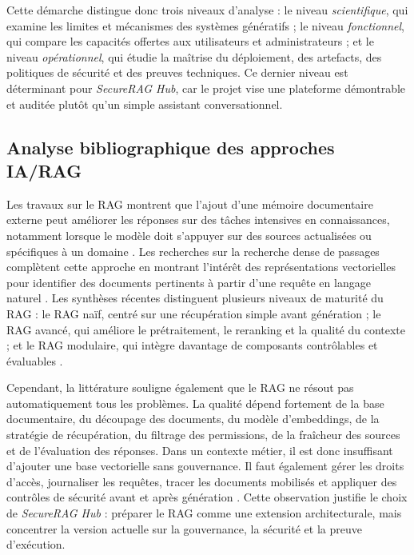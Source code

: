 Cette démarche distingue donc trois niveaux d’analyse : le niveau \textit{scientifique}, qui examine les limites et mécanismes des systèmes génératifs ; le niveau \textit{fonctionnel}, qui compare les capacités offertes aux utilisateurs et administrateurs ; et le niveau \textit{opérationnel}, qui étudie la maîtrise du déploiement, des artefacts, des politiques de sécurité et des preuves techniques. Ce dernier niveau est déterminant pour \textit{SecureRAG Hub}, car le projet vise une plateforme démontrable et auditée plutôt qu’un simple assistant conversationnel.

\subsection{Analyse bibliographique des approches IA/RAG}

Les travaux sur le RAG montrent que l’ajout d’une mémoire documentaire externe peut améliorer les réponses sur des tâches intensives en connaissances, notamment lorsque le modèle doit s’appuyer sur des sources actualisées ou spécifiques à un domaine \cite{lewis_rag_2020}. Les recherches sur la recherche dense de passages complètent cette approche en montrant l’intérêt des représentations vectorielles pour identifier des documents pertinents à partir d’une requête en langage naturel \cite{karpukhin_dpr_2020}. Les synthèses récentes distinguent plusieurs niveaux de maturité du RAG : le RAG naïf, centré sur une récupération simple avant génération ; le RAG avancé, qui améliore le prétraitement, le reranking et la qualité du contexte ; et le RAG modulaire, qui intègre davantage de composants contrôlables et évaluables \cite{gao_rag_survey_2024}.

Cependant, la littérature souligne également que le RAG ne résout pas automatiquement tous les problèmes. La qualité dépend fortement de la base documentaire, du découpage des documents, du modèle d’embeddings, de la stratégie de récupération, du filtrage des permissions, de la fraîcheur des sources et de l’évaluation des réponses. Dans un contexte métier, il est donc insuffisant d’ajouter une base vectorielle sans gouvernance. Il faut également gérer les droits d’accès, journaliser les requêtes, tracer les documents mobilisés et appliquer des contrôles de sécurité avant et après génération \cite{nist_ai_rmf_2023,owasp_llm_top10_2025}. Cette observation justifie le choix de \textit{SecureRAG Hub} : préparer le RAG comme une extension architecturale, mais concentrer la version actuelle sur la gouvernance, la sécurité et la preuve d’exécution.


